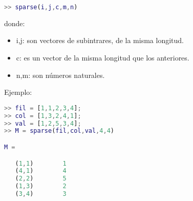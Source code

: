 \begin{lstlisting}[language=Matlab]
>> sparse(i,j,c,m,n)
\end{lstlisting}
donde:
\begin{itemize}
\item i,j: son vectores de subintrares, de la misma longitud.
\item c: es un vector de la misma longitud que los anteriores.
\item n,m: son números naturales.
\end{itemize}

Ejemplo:
\begin{lstlisting}[language=Matlab]
>> fil = [1,1,2,3,4];
>> col = [1,3,2,4,1];
>> val = [1,2,5,3,4];
>> M = sparse(fil,col,val,4,4)

M =

   (1,1)        1
   (4,1)        4
   (2,2)        5
   (1,3)        2
   (3,4)        3
\end{lstlisting}